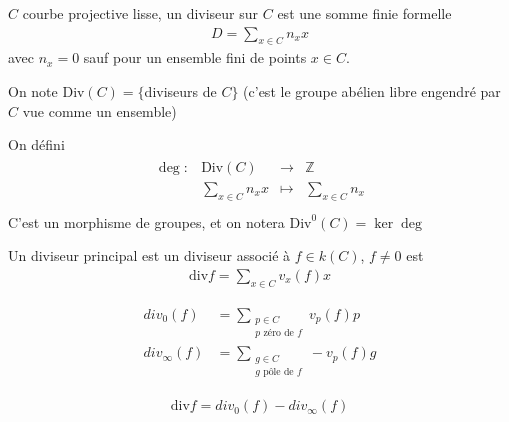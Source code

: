         \begin{defi}
            $C$ courbe projective lisse, un diviseur sur $C$ est une somme finie formelle
            \begin{align*}
                D = \sum_{x \in C} n_xx
            \end{align*}
            avec $n_x = 0$ sauf pour un ensemble fini de points $x \in C$.
        \end{defi}
        \begin{nota}
            On note $\mathrm{Div}(C) = \{$diviseurs de $C\}$ (c'est le groupe abélien libre engendré par $C$ vue comme un ensemble)
        \end{nota}
        \begin{nota}
            On défini
            \begin{align*}
                \begin{array}{cccc}
                    \deg : & \mathrm{Div}(C) & \to & \mathbb{Z} \\
                    & \sum_{x \in C} n_xx & \mapsto & \sum_{x \in C} n_x \\
                \end{array}
            \end{align*}
            C'est un morphisme de groupes, et on notera $\mathrm{Div}^0(C) = \ker \deg$
        \end{nota}
        \begin{defi}
            Un diviseur principal est un diviseur associé à $f \in k(C)$, $f \neq 0$ est 
            \begin{align*}
                \mathrm{div} f = \sum_{x \in C} v_x(f)x
            \end{align*}
        \end{defi}
        \begin{nota}
            \begin{align*}
                div_0(f) &= \sum_{\substack{p \in C \\ p \text{ zéro de } f}} v_p(f)p \\
                div_\infty(f) &= \sum_{\substack{g \in C \\ g \text{ pôle de } f}} -v_p(f)g
            \end{align*}
        \end{nota}
        \begin{remq}
            \begin{align*}
                \mathrm{div} f = div_0(f) - div_\infty(f)             
            \end{align*}
        \end{remq}
